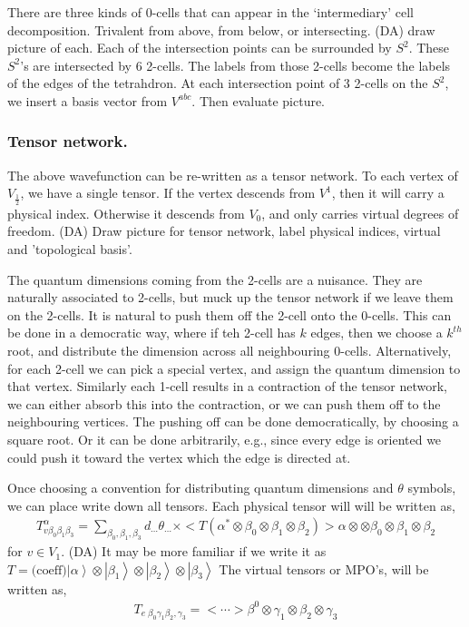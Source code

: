 \documentclass[12pt,a4paper]{article}
\newcommand{\tp}{\otimes}
\newcommand{\ket}[1]{\ensuremath{\left|#1\right\rangle}}
\newcommand{\dave}[1]{{\color{ao(english)}\footnotesize{(DA) #1}}}
\begin{document}
There are three kinds of 0-cells that can appear in the `intermediary' cell decomposition. 
Trivalent from above, from below, or intersecting. \dave{draw picture of each.}
Each of the intersection points can be surrounded by $S^2$. 
These $S^2$'s are intersected by $6$ 2-cells. 
The labels from those 2-cells become the labels of the edges of the tetrahdron.
At each intersection point of 3 2-cells on the $S^2$, we insert a basis vector from $V^{abc}$. 
Then evaluate picture.

\subsubsection{Tensor network.}
The above wavefunction can be re-written as a tensor network.
To each vertex of $V_{\frac{1}{2}}$, we have a single tensor. 
If the vertex descends from $V^{1}$, then it will carry a physical index. 
Otherwise it descends from $V_0$, and only carries virtual degrees of freedom.
\dave{Draw picture for tensor network, label physical indices, virtual and 'topological basis'.}


The quantum dimensions coming from the 2-cells are a nuisance. 
They are naturally associated to 2-cells, but muck up the tensor network if we leave them on the 2-cells. 
It is natural to push them off the 2-cell onto the 0-cells. 
This can be done in a democratic way, where if teh 2-cell has $k$ edges, then we choose a $k^{th}$ root, and distribute the dimension across all neighbouring 0-cells. 
Alternatively, for each 2-cell we can pick a special vertex, and assign the quantum dimension to that vertex.
Similarly each 1-cell results in a contraction of the tensor network, we can either absorb this into the contraction, or we can push them off to the neighbouring vertices. 
The pushing off can be done democratically, by choosing a square root. 
Or it can be done arbitrarily, e.g., since every edge is oriented we could push it toward the vertex which the edge is directed at. 

Once choosing a convention for distributing quantum dimensions and $\theta$ symbols,
we can place write down all tensors.
Each physical tensor will will be written as,
\begin{align}
T^{\alpha}_{v \beta_0 \beta_1 \beta_3}  = \sum_{\beta_0,\beta_1,\beta_3}d_{\cdots} \theta_{\cdots} \times  <T(\alpha^* \tp \beta_0 \tp \beta_1 \tp \beta_2)> \alpha \tp  \tp \beta_0 \tp \beta_1 \tp \beta_2
\end{align}
for $v \in V_1$. 
\dave{It may be more familiar if we write it as $T = \text{(coeff)} \ket{\alpha} \tp \ket{\beta_1} \tp \ket{\beta_2} \tp \ket{\beta_3}$}
The virtual tensors or MPO's, will be written as,
\begin{align}
T_{e \; \beta_0 \gamma_1 \beta_2 , \gamma_3} = < \cdots> \beta^0\tp  \gamma_1 \tp \beta_2 \tp \gamma_3
\end{align}
\end{document}
